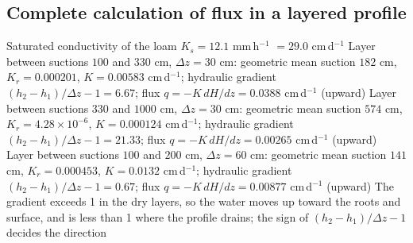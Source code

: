 \subsection{Complete calculation of flux in a layered profile}
\sol
\ans Saturated conductivity of the loam $K_s=12.1$ mm\,h$^{-1}$ $=29.0$ cm\,d$^{-1}$
\ans Layer between suctions $100$ and $330$ cm, $\Delta z=30$ cm: geometric mean suction $182$ cm, $K_r=0.000201$, $K=0.00583$ cm\,d$^{-1}$; hydraulic gradient $(h_2-h_1)/\Delta z-1=6.67$; flux $q=-K\,dH/dz=0.0388$ cm\,d$^{-1}$ (upward)
\ans Layer between suctions $330$ and $1000$ cm, $\Delta z=30$ cm: geometric mean suction $574$ cm, $K_r=4.28\times10^{-6}$, $K=0.000124$ cm\,d$^{-1}$; hydraulic gradient $(h_2-h_1)/\Delta z-1=21.33$; flux $q=-K\,dH/dz=0.00265$ cm\,d$^{-1}$ (upward)
\ans Layer between suctions $100$ and $200$ cm, $\Delta z=60$ cm: geometric mean suction $141$ cm, $K_r=0.000453$, $K=0.0132$ cm\,d$^{-1}$; hydraulic gradient $(h_2-h_1)/\Delta z-1=0.67$; flux $q=-K\,dH/dz=0.00877$ cm\,d$^{-1}$ (upward)
\ans The gradient exceeds 1 in the dry layers, so the water moves up toward the roots and surface, and is less than 1 where the profile drains; the sign of $(h_2-h_1)/\Delta z-1$ decides the direction \finans


